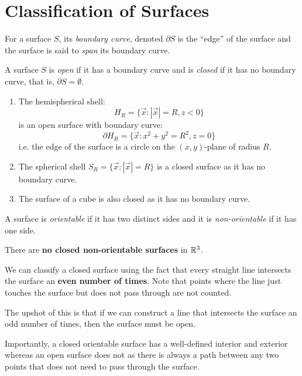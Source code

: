 \documentclass[../main.tex]{subfiles}
\begin{document}
\section{Classification of Surfaces}
\begin{definition}
  For a surface $S$, its \textit{boundary curve}, denoted $\partial S$ is the ``edge'' of the surface and the surface is said to \textit{span} its boundary curve.
\end{definition}
\begin{definition}
  A surface $S$ is \textit{open} if it has a boundary curve and is \textit{closed} if it has no boundary curve, that is, $\partial S = \emptyset$.
\end{definition}
\begin{example}
  \begin{enumerate}
    \item The hemispherical shell:
      \[
        H_R = \{\vec{x}: |\vec{x}| = R, z < 0\}
      \]
      is an open surface with boundary curve:
      \[
        \partial H_R = \{\vec{x}: x^2 + y^2 = R^2, z = 0\}
      \]
      i.e. the edge of the surface is a circle on the $(x, y)$-plane of radius $R$.
    \item The spherical shell $S_R = \{\vec{x}: |\vec{x}| = R\}$ is a closed surface as it has no boundary curve.
    \item The surface of a cube is also closed as it has no boundary curve.
  \end{enumerate}
\end{example}
\begin{definition}
  A surface is \textit{orientable} if it has two distinct sides and it is \textit{non-orientable} if it has one side.
\end{definition}
\begin{remark}
  There are \textbf{no closed non-orientable surfaces} in $\mathbb{R}^3$.
\end{remark}
\begin{remark}
  \nonexaminable
  We can classify a closed surface using the fact that every straight line intersects the surface an \textbf{even number of times}.
  Note that points where the line just touches the surface but does not pass through are not counted.

  The upshot of this is that if we can construct a line that intersects the surface an odd number of times, then the surface must be open.
\end{remark}
Importantly, a closed orientable surface has a well-defined interior and exterior whereas an open surface does not as there is always a path between any two points that does not need to pass through the surface.
\end{document}
